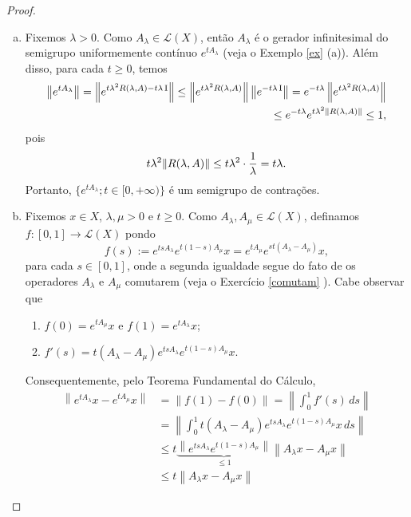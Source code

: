 \begin{proof}
\begin{enumerate}[(a)]
\item
Fixemos $\lambda >0$. Como $A_\lambda \in \mathcal{L}(X)$, então $A_\lambda$ é o gerador infinitesimal do semigrupo uniformemente contínuo $e^{tA_\lambda}$ (veja o Exemplo \ref{ex} (a)). Além disso, para cada $t\geq 0$, temos
\begin{align*}
\left\|e^{tA_\lambda}\right\|
 =\left\|e^{t\lambda^2R(\lambda,A)-t\lambda \operatorname{I}}\right\|
\leq \left\|e^{t\lambda^2R(\lambda,A)}\right\|\left\|e^{-t\lambda \operatorname{I}} \right\|
=e^{-t\lambda }\left\|e^{t\lambda^2R(\lambda,A)}\right\|\\ 
\leq e^{-t\lambda }e^{t\lambda^2\left\|R(\lambda,A)\right\|}
 \leq 1,
\end{align*}
pois 
\[
t\lambda ^2 \| R(\lambda,A) \| \leq t\lambda ^2 \cdot \frac{1}{\lambda} = t\lambda .
\]
Portanto, $\{ e^{tA_\lambda} ; t\in [0,+\infty )\}$ é um semigrupo de contrações.

\item Fixemos $x\in X$, $\lambda , \mu >0$ e $t\geq 0$. Como $A_\lambda,  A_\mu\in\mathcal{L}(X)$, definamos $f:[0,1] \longrightarrow \mathcal L (X)$ pondo
\[f(s):=e^{tsA_\lambda}e^{t(1-s)A_\mu}x=e^{tA_\mu}e^{st(A_\lambda-A_\mu)}x ,\]
para cada $s\in [0,1]$, onde a segunda igualdade segue do fato de os operadores $A_{\lambda}$ e $A_{\mu}$ comutarem (veja o Exercício \ref{comutam} ). Cabe observar que
\begin{enumerate}[1.]
\item $f(0)=e^{tA_\mu}x$ e $f(1)=e^{tA_\lambda}x$;
\item $f'(s)=t(A_\lambda-A_\mu)e^{tsA_\lambda}e^{t(1-s)A_\mu}x$.
\end{enumerate}
Consequentemente, pelo Teorema Fundamental do Cálculo,
\begin{align*}
\left\|e^{tA_\lambda}x-e^{tA_\mu}x \right\|
& =\left\|f(1)-f(0) \right\|=
\left\|\int_0^1 f'(s)\,ds \right\|\\
& =\left\|\int_0^1 
t(A_\lambda-A_\mu)e^{tsA_\lambda}e^{t(1-s)A_\mu}x \,ds \right\|\\
& \leq t\underbrace{\left\|e^{tsA_\lambda}e^{t(1-s)A_\mu}\right\|}_{\leq 1}   \left\|A_\lambda x-A_\mu x\right\|\\
& \leq t \left\|A_\lambda x-A_\mu x\right\|
\end{align*}
\end{enumerate}
\end{proof}

